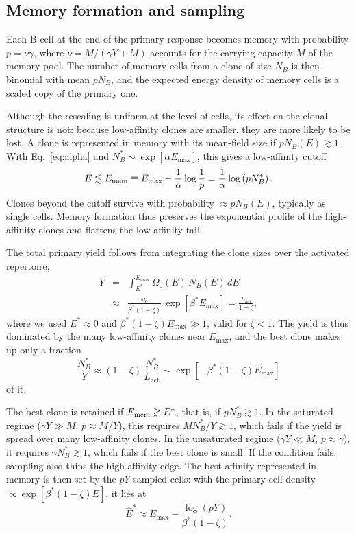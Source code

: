 \documentclass[aps, pre, twocolumn, 10pt, groupedaddress, superscriptaddress, linenumbers]{revtex4-2}
\newcommand{\EQ}{\begin{equation}}
\newcommand{\EE}{\end{equation}}
\newcommand{\EQA}{\begin{eqnarray}}
\newcommand{\EEA}{\end{eqnarray}}
\newcommand{\act}{\text{act}}
\newcommand{\DG}{E}
\begin{document}
\subsection*{Memory formation and sampling}
Each B cell at the end of the primary response becomes memory with probability $p = \nu\gamma$, where $\nu = M/(\gamma Y + M)$ accounts for the carrying capacity $M$ of the memory pool.
The number of memory cells from a clone of size $N_B$ is then binomial with mean $p N_B$, and the expected energy density of memory cells is a scaled copy of the primary one.

Although the rescaling is uniform at the level of cells, its effect on the clonal structure is not: because low-affinity clones are smaller, they are more likely to be lost.
A clone is represented in memory with its mean-field size if $p N_B(\DG) \gtrsim 1$.
With Eq.~\ref{eq:alpha} and $N_B^* \sim \exp[\alpha\DG_{\max}]$, this gives a low-affinity cutoff
\EQ
\DG \lesssim \DG_{\rm mem} \equiv \DG_{\max} - \frac{1}{\alpha}\log\frac{1}{p} = \frac{1}{\alpha}\log\left(p N_B^*\right).
\label{eq:E_mem}
\EE
Clones beyond the cutoff survive with probability $\approx p N_B(\DG)$, typically as single cells.
Memory formation thus preserves the exponential profile of the high-affinity clones and flattens the low-affinity tail.

The total primary yield follows from integrating the clone sizes over the activated repertoire,
\EQA
Y &=& \int_{\DG^*}^{\DG_{\max}} \Omega_0(\DG)\, N_B(\DG)\, d\DG\nonumber\\
&\approx& \frac{\omega_0}{\beta^*(1-\zeta)}\, \exp[\beta^*\DG_{\max}] = \frac{L_\act}{1-\zeta},
\label{eq:yield}
\EEA
where we used $\DG^* \approx 0$ and $\beta^*(1-\zeta)\DG_{\max} \gg 1$, valid for $\zeta < 1$.
The yield is thus dominated by the many low-affinity clones near $\DG_{\max}$, and the best clone makes up only a fraction
\EQ
\frac{N_B^*}{Y} \approx (1-\zeta)\, \frac{N_B^*}{L_\act} \sim \exp[-\beta^*(1-\zeta)\DG_{\max}]
\EE
of it.

The best clone is retained if $\DG_{\rm mem} \gtrsim \DG^*$, that is, if $p N_B^* \gtrsim 1$.
In the saturated regime ($\gamma Y \gg M$, $p \approx M/Y$), this requires $M N_B^*/Y \gtrsim 1$, which fails if the yield is spread over many low-affinity clones.
In the unsaturated regime ($\gamma Y \ll M$, $p \approx \gamma$), it requires $\gamma N_B^* \gtrsim 1$, which fails if the best clone is small.
If the condition fails, sampling also thins the high-affinity edge.
The best affinity represented in memory is then set by the $pY$ sampled cells: with the primary cell density $\propto \exp[\beta^*(1-\zeta)\DG]$, it lies at
\EQ
\hat\DG^* \approx \DG_{\max} - \frac{\log(pY)}{\beta^*(1-\zeta)}.
\EE
\end{document}
